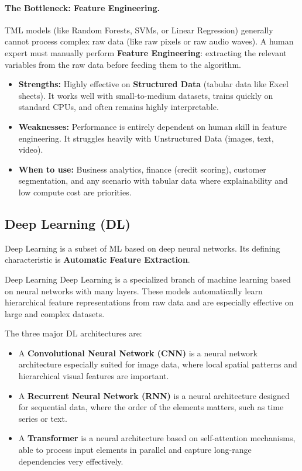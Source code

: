 \documentclass[11pt]{article}
\theoremstyle{smallexample}
\newcommand{\vs}{\vspace{0.2\baselineskip}}
\begin{document}
\vspace{-0.2cm}
\paragraph*{The Bottleneck: Feature Engineering.}
TML models (like Random Forests, SVMs, or Linear Regression) generally cannot process complex raw data (like raw pixels or raw audio waves). A human expert must manually perform \textbf{Feature Engineering}: extracting the relevant variables from the raw data before feeding them to the algorithm. 

\begin{itemize}
    \item \textbf{Strengths:} Highly effective on \textbf{Structured Data} (tabular data like Excel sheets). It works well with small-to-medium datasets, trains quickly on standard CPUs, and often remains highly interpretable.
    \item \textbf{Weaknesses:} Performance is entirely dependent on human skill in feature engineering. It struggles heavily with Unstructured Data (images, text, video).
    \item \textbf{When to use:} Business analytics, finance (credit scoring), customer segmentation, and any scenario with tabular data where explainability and low compute cost are priorities.
\end{itemize}

\subsection{Deep Learning (DL)}

Deep Learning is a subset of ML based on deep neural networks. Its defining characteristic is \textbf{Automatic Feature Extraction}.

 \begin{defbox}{Deep Learning}
 Deep Learning is a specialized branch of machine learning based on neural networks with many layers. These models automatically learn hierarchical feature representations from raw data and are especially effective on large and complex datasets.
 \end{defbox}

 The  three major DL architectures are:

\begin{itemize}
 \item A \textbf{Convolutional Neural Network (CNN)} is a neural network architecture especially suited for image data, where local spatial patterns and hierarchical visual features are important.
\vs


\item  A \textbf{Recurrent Neural Network (RNN) }is a neural architecture designed for sequential data, where the order of the elements matters, such as time series or text.
\vs


 \item A \textbf{Transformer} is a neural architecture based on self-attention mechanisms, able to process input elements in parallel and capture long-range dependencies very effectively.

\end{itemize}
\end{document}
